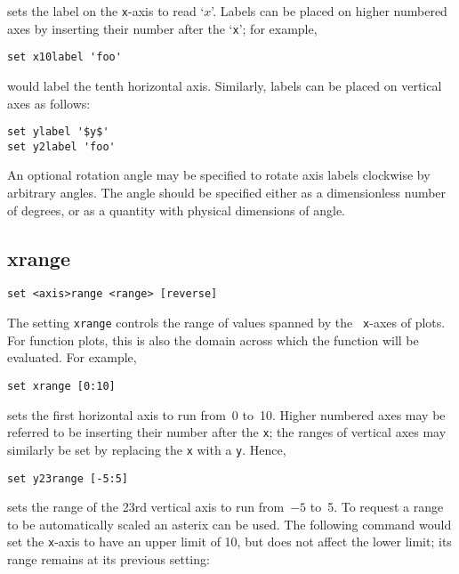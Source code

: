 \noindent sets the label on the {\tt x}-axis to read `$x$'.  Labels can be
placed on higher numbered axes by inserting their number after the `{\tt x}';
for example,

\begin{verbatim}
set x10label 'foo'
\end{verbatim}

\noindent would label the tenth horizontal axis. Similarly, labels can be
placed on vertical axes as follows:

\begin{verbatim}
set ylabel '$y$'
set y2label 'foo'
\end{verbatim}

An optional rotation angle may be specified to rotate axis labels clockwise by
arbitrary angles. The angle should be specified either as a dimensionless
number of degrees, or as a quantity with physical dimensions of angle.

\subsection{xrange}

\begin{verbatim}
set <axis>range <range> [reverse]
\end{verbatim}

The setting {\tt xrange} controls the range of values spanned by the {\tt
x}-axes of plots.  For function plots, this is also the domain across which the
function will be evaluated.  For example,

\begin{verbatim}
set xrange [0:10]
\end{verbatim}

\noindent sets the first horizontal axis to run from~0 to~10.  Higher numbered
axes may be referred to be inserting their number after the {\tt x}; the ranges
of vertical axes may similarly be set by replacing the {\tt x} with a {\tt y}.
Hence,

\begin{verbatim}
set y23range [-5:5]
\end{verbatim}

\noindent sets the range of the 23rd vertical axis to run from~$-5$ to~5.  To
request a range to be automatically scaled an asterix can be used.  The
following command would set the {\tt x}-axis to have an upper limit of 10, but
does not affect the lower limit; its range remains at its previous setting:

